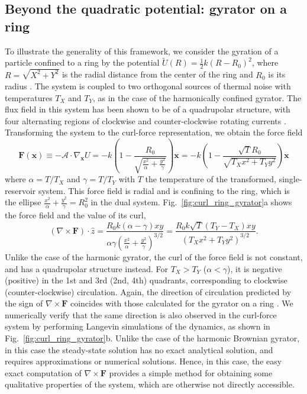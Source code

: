 \subsection{Beyond the quadratic potential: gyrator on a ring}
To illustrate the generality of this framework, we consider the gyration of a particle confined to a ring by the potential $\tilde{U}(R) = \frac{1}{2}k(R-R_0)^2$, where $R=\sqrt{X^2+Y^2}$ is the radial distance from the center of the ring and $R_0$ is its radius \cite{abdoli2025quadrupolar}. The system is coupled to two orthogonal sources of thermal noise with temperatures $T_{X}$ and $T_{Y}$, as in the case of the harmonically confined gyrator. The flux field in this system has been shown to be of a quadrupolar structure, with four alternating regions of clockwise and counter-clockwise rotating currents \cite{abdoli2025quadrupolar}. Transforming the system to the curl-force representation, we obtain the force field
\begin{equation}
   \mathbf{F}(\mathbf{x}) \equiv -\mathcal{A}\cdot\nabla_{\mathbf{x}}U = -k\left( 1 - \frac{R_0}{\sqrt{\frac{x^2}{\alpha} + \frac{y^2}{\gamma}}} \right) \mathbf{x} = -k\left( 1 - \frac{\sqrt{T}R_0}{\sqrt{T_X{x^2} + T_Yy^2}} \right) \mathbf{x}
\end{equation}
where $\alpha = T/T_X$ and $\gamma = T/T_Y$ with $T$ the temperature of the transformed, single-reservoir system. This force field is radial and is confining to the ring, which is the ellipse ${\frac{x^2}{\alpha} + \frac{y^2}{\gamma}} = R_0^2$ in the dual system. Fig.~\ref{fig:curl_ring_gyrator}a shows the force field and the value of its curl,
\begin{equation}
    (\nabla \times \mathbf{F})\cdot\hat{z} = \frac{R_0 k \left(\alpha - \gamma\right) x y}{\alpha\gamma\left( \frac{x^2}{\alpha} + \frac{y^2}{\gamma} \right)^{3/2}} = \frac{R_0 k \sqrt{T} (T_Y - T_X)xy}{(T_X x^2 + T_Y y^2)^{3/2}}.
\end{equation}
Unlike the case of the harmonic gyrator, the curl of the force field is not constant, and has a quadrupolar structure instead. For $T_X>T_Y$ ($\alpha<\gamma$), it is negative (positive) in the 1st and 3rd (2nd, 4th) quadrants, corresponding to clockwise (counter-clockwise) circulation. Again, the direction of circulation predicted by the sign of $\nabla \times \mathbf{F}$ coincides with those calculated for the gyrator on a ring \cite{abdoli2025quadrupolar}. We numerically verify that the same direction is also observed in the curl-force system by performing Langevin simulations \cite{rackauckas2017differentialequations, rackauckas2017adaptive, rossler2010runge} of the dynamics, as shown in Fig.~\ref{fig:curl_ring_gyrator}b. Unlike the case of the harmonic Brownian gyrator, in this case the steady-state solution has no exact analytical solution, and requires approximations or numerical solutions. Hence, in this case, the easy exact computation of $\nabla \times \mathbf{F}$ provides a simple method for obtaining some qualitative properties of the system, which are otherwise not directly accessible.

